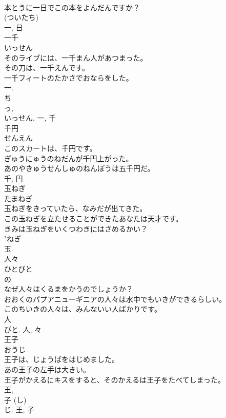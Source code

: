 \documentclass[8pt]{extreport}
\begin{document}
\begin{CJK}{UTF8}{min}
\\	本とうに一日でこの本をよんだんですか？	
\\	(ついたち) 
\\	一, 日	
\\	一千	
\\	いっせん	
\\	そのライブには、一千まん人があつまった。	
\\	その刀は、一千えんです。	
\\	一千フィートのたかさでおならをした。	
\\	一. 
\\	ち 
\\	っ, 
\\	いっせん.	一, 千	
\\	千円	
\\	せんえん	
\\	このスカートは、千円です。	
\\	ぎゅうにゅうのねだんが千円上がった。	
\\	あのやきゅうせんしゅのねんぽうは五千円だ。	
\\	千, 円	
\\	玉ねぎ	
\\	たまねぎ	
\\	玉ねぎをきっていたら、なみだが出てきた。	
\\	この玉ねぎを立たせることができたあなたは天才です。	
\\	きみは玉ねぎをいくつわきにはさめるかい？	
\\	"ねぎ 
\\	玉	
\\	人々	
\\	ひとびと	
\\	の 
\\	なぜ人々はくるまをかうのでしょうか？	
\\	おおくのパプアニューギニアの人々は水中でもいきができるらしい。	
\\	このちいきの人々は、みんないい人ばかりです。	
\\	人 
\\	びと.	人, 々	
\\	王子	
\\	おうじ	
\\	王子は、じょうばをはじめました。	
\\	あの王子の左手は大きい。	
\\	王子がかえるにキスをすると、そのかえるは王子をたべてしまった。	
\\	王, 
\\	子 (し) 
\\	じ.	王, 子	

\end{CJK}
\end{document}
